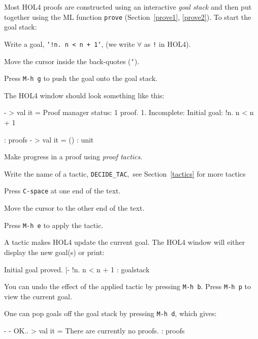 \documentclass[a4paper,10pt]{article}
\begin{document}

Most HOL4 proofs are constructed using an interactive \emph{goal
  stack} and then put together using the ML function {\tt prove}
(Section~\ref{prove1}, \ref{prove2}). To start the goal stack:
\begin{enum}
\item Write a goal, \eg{} {\tt `!n{.}~n < n + 1`}, (we write $\forall$ as {\tt !} in HOL4).
\item Move the cursor inside the back-quotes ({\tt `}).
\item Press {\tt M-h g} to push the goal onto the goal stack.
\end{enum}
The HOL4 window should look something like this:
\begin{code}
- > val it =
    Proof manager status: 1 proof.
    1. Incomplete:
         Initial goal:
         !n. n < n + 1

     : proofs
- > val it = () : unit
\end{code}


Make progress in a proof using \emph{proof tactics}.

\begin{enum}
\item Write the name of a tactic, \eg{} {\tt DECIDE\_TAC},~see Section~\ref{tactics} for more tactics
\item Press {\tt C-space} at one end of the text.
\item Move the cursor to the other end of the text.
\item Press {\tt M-h e} to apply the tactic.
\end{enum}
A tactic makes HOL4 update the current goal. The HOL4 window will either
display the new goal(s) or print:
\begin{code}
    Initial goal proved.
    |- !n. n < n + 1 : goalstack
\end{code}
You can undo the effect of the applied tactic by pressing {\tt M-h b}. Press {\tt M-h p} to view the current goal.


One can pop goals off the goal stack by pressing {\tt M-h d}, which gives:
\begin{code}
- - OK..
> val it = There are currently no proofs. : proofs
\end{code}

\end{document}
